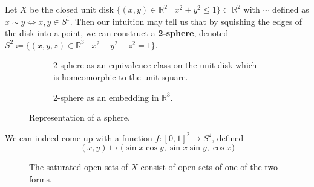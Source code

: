  \begin{example}[2-Sphere]
    Let $X$ be the closed unit disk $\{(x, y) \in \mathbb{R}^2 \mid x^2 + y^2 \leq 1\} \subset \mathbb{R}^2$ with $\sim$ defined as $x \sim y \iff x, y \in S^1$. Then our intuition may tell us that by squishing the edges of the disk into a point, we can construct a \textbf{2-sphere}, denoted $S^2 \coloneqq \{(x, y, z) \in \mathbb{R}^3 \mid x^2 + y^2 + z^2 = 1\}$. 

    \begin{figure}[H]
      \centering
      \begin{subfigure}[b]{0.48\textwidth}
        \centering
        \caption{2-sphere as an equivalence class on the unit disk which is homeomorphic to the unit square.}
        \label{fig:S2_disk}
      \end{subfigure}
      \hfill 
      \begin{subfigure}[b]{0.48\textwidth}
        \centering
        \caption{2-sphere as an embedding in $\mathbb{R}^3$.}
        \label{fig:S2_R3}
      \end{subfigure}
      \caption{Representation of a sphere.}
      \label{fig:2sphere}
    \end{figure}

    We can indeed come up with a function $f: [0,1]^2 \rightarrow S^2$, defined 
    \begin{equation}
      (x, y) \mapsto \big( \sin{x} \cos{y}, \sin{x} \sin{y}, \cos{x} \big)
    \end{equation}

    \begin{figure}[H]
      \centering 
      \caption{The saturated open sets of $X$ consist of open sets of one of the two forms. } 
      \label{fig:open_in_s2}
    \end{figure}
  \end{example} 

